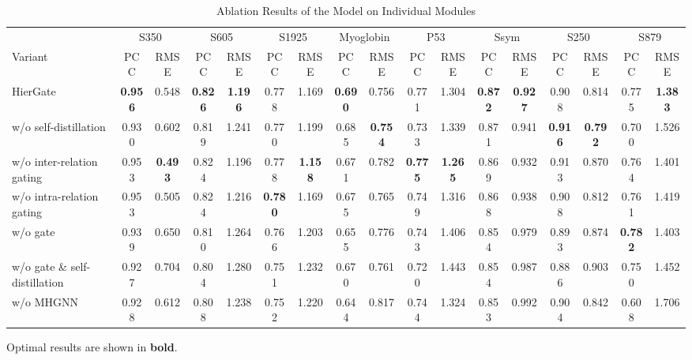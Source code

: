 \documentclass[journal,twoside,web]{ieeecolor}
\begin{document}
\begin{table}[!t]
\footnotesize
\setlength{\tabcolsep}{3pt}
\caption{Ablation Results of the Model on Individual Modules}
\label{tab:ablation_mod}
\begin{tabular*}{\textwidth}{@{\extracolsep{\fill}}lcccccccccccccccc}
\toprule
& \multicolumn{2}{c}{S350} & \multicolumn{2}{c}{S605} & \multicolumn{2}{c}{S1925} & \multicolumn{2}{c}{Myoglobin}
& \multicolumn{2}{c}{P53} & \multicolumn{2}{c}{Ssym} & \multicolumn{2}{c}{S250} & \multicolumn{2}{c}{S879} \\
\cmidrule(lr){2-3} \cmidrule(lr){4-5} \cmidrule(lr){6-7} \cmidrule(lr){8-9}
\cmidrule(lr){10-11} \cmidrule(lr){12-13} \cmidrule(lr){14-15} \cmidrule(lr){16-17}
Variant & PCC & RMSE & PCC & RMSE & PCC & RMSE & PCC & RMSE
        & PCC & RMSE & PCC & RMSE & PCC & RMSE & PCC & RMSE \\
\midrule
HierGate                      & \textbf{0.956} & 0.548 & \textbf{0.826} & \textbf{1.196} & 0.778 & 1.169 & \textbf{0.690} & 0.756
                              & 0.771 & 1.304 & \textbf{0.872} & \textbf{0.927} & 0.908 & 0.814 & 0.775 & \textbf{1.383} \\
w/o self-distillation         & 0.930 & 0.602 & 0.819 & 1.241 & 0.770 & 1.199 & 0.685 & \textbf{0.754}
                              & 0.733 & 1.339 & 0.871 & 0.941 & \textbf{0.916} & \textbf{0.792} & 0.700 & 1.526 \\
w/o inter-relation gating         & 0.953 & \textbf{0.493} & 0.824 & 1.196 & 0.778 & \textbf{1.158} & 0.671 & 0.782
                              & \textbf{0.775} & \textbf{1.265} & 0.869 & 0.932 & 0.913 & 0.870 & 0.764 & 1.401 \\
w/o intra-relation gating         & 0.953 & 0.505 & 0.824 & 1.216 & \textbf{0.780} & 1.169 & 0.675 & 0.765
                              & 0.749 & 1.316 & 0.868 & 0.938 & 0.908 & 0.812 & 0.761 & 1.419 \\
w/o gate                      & 0.939 & 0.650 & 0.810 & 1.264 & 0.766 & 1.203 & 0.655 & 0.776
                              & 0.743 & 1.406 & 0.854 & 0.979 & 0.893 & 0.874 & \textbf{0.782} & 1.403 \\
w/o gate \& self-distillation & 0.927 & 0.704 & 0.804 & 1.280 & 0.751 & 1.232 & 0.670 & 0.761
                              & 0.720 & 1.443 & 0.854 & 0.987 & 0.886 & 0.903 & 0.750 & 1.452 \\
w/o MHGNN                       & 0.928 & 0.612 & 0.808 & 1.238 & 0.752 & 1.220 & 0.644 & 0.817
                              & 0.744 & 1.324 & 0.853 & 0.992 & 0.904 & 0.842 & 0.608 & 1.706 \\
\bottomrule
\end{tabular*}
\smallskip

\raggedright\footnotesize Optimal results are shown in \textbf{bold}.
\end{table}
\end{document}
